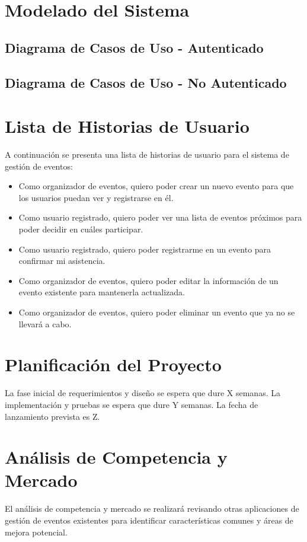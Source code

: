 \documentclass[a4paper]{article}
\begin{document}
\section{Modelado del Sistema}

\subsection{Diagrama de Casos de Uso - Autenticado}


\subsection{Diagrama de Casos de Uso - No Autenticado}


\section{Lista de Historias de Usuario}
A continuación se presenta una lista de historias de usuario para el sistema de gestión de eventos:
\begin{itemize}
    \item Como organizador de eventos, quiero poder crear un nuevo evento para que los usuarios puedan ver y registrarse en él.
    \item Como usuario registrado, quiero poder ver una lista de eventos próximos para poder decidir en cuáles participar.
    \item Como usuario registrado, quiero poder registrarme en un evento para confirmar mi asistencia.
    \item Como organizador de eventos, quiero poder editar la información de un evento existente para mantenerla actualizada.
    \item Como organizador de eventos, quiero poder eliminar un evento que ya no se llevará a cabo.
\end{itemize}

\section{Planificación del Proyecto}
La fase inicial de requerimientos y diseño se espera que dure X semanas. La implementación y pruebas se espera que dure Y semanas. La fecha de lanzamiento prevista es Z.

\section{Análisis de Competencia y Mercado}
El análisis de competencia y mercado se realizará revisando otras aplicaciones de gestión de eventos existentes para identificar características comunes y áreas de mejora potencial.
\end{document}

